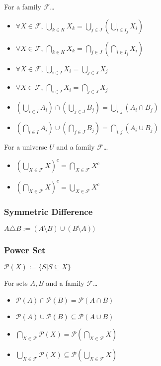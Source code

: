 \begin{proposition}
For a family $\mathcal{F}$\dots
\begin{itemize}
  \item $\forall X \in \mathcal{F}, \, \bigcup_{k \in K} X_k = \bigcup_{j \in J} (\bigcup_{i \in I_j} X_i)$
  \item $\forall X \in \mathcal{F}, \, \bigcap_{k \in K} X_k = \bigcap_{j \in J} (\bigcap_{i \in I_j} X_i)$
  \item $\forall X \in \mathcal{F}, \, \bigcup_{i \in I} X_i = \bigcup_{j \in J} X_j$
  \item $\forall X \in \mathcal{F}, \, \bigcap_{i \in I} X_i = \bigcap_{j \in J} X_j$
  \item $(\bigcup_{i \in I} A_i)\cap (\bigcup_{j \in J} B_j) = \bigcup_{i,j}(A_i \cap B_j)$
  \item $(\bigcap_{i \in I} A_i)\cup (\bigcap_{j \in J} B_j) = \bigcap_{i,j}(A_i \cup B_j)$
\end{itemize}
\end{proposition}

\begin{proposition}
For a universe $U$ and a family $\mathcal{F}$\dots
\begin{itemize}
  \item $(\bigcup_{X \in \mathcal{F}} X)^c = \bigcap_{X \in \mathcal{F}} X^c$
  \item $(\bigcap_{X \in \mathcal{F}} X)^c = \bigcup_{X \in \mathcal{F}} X^c$
\end{itemize} 
\end{proposition}
	
\subsubsection{Symmetric Difference}\label{symmetricdifference}
$A \ensuremath{\triangle} B := (A \setminus B) \cup (B \setminus A))$
	
\subsubsection{Power Set}\label{powerset}
$\mathcal{P}(X) := \{S |S \subseteq X\}$

\begin{proposition}
For sets $A,B$ and a family $\mathcal{F}$\dots
\begin{itemize}
  \item $\mathcal{P}(A) \cap \mathcal{P}(B) = \mathcal{P}(A \cap B)$
  \item $\mathcal{P}(A) \cup \mathcal{P}(B) \subseteq \mathcal{P}(A \cup B)$
  \item $\bigcap_{X \in \mathcal{F}}\mathcal{P}(X) = \mathcal{P}(\bigcap_{X \in \mathcal{F}} X)$
  \item $\bigcup_{X \in \mathcal{F}}\mathcal{P}(X) \subseteq \mathcal{P}(\bigcup_{X \in \mathcal{F}} X)$
\end{itemize}
\end{proposition}

